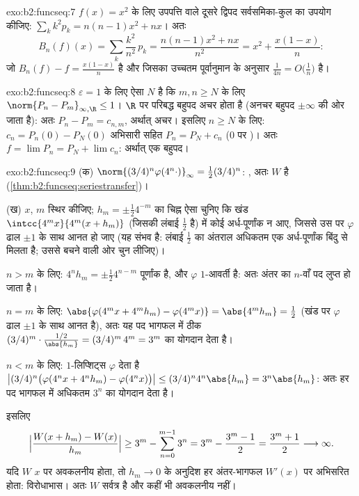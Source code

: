 \begin{solution}{exo:b2:funcseq:7}
$f(x) = x^2$ के लिए उपपत्ति वाले दूसरे द्विपद सर्वसमिका-कुल का उपयोग कीजिए: $\sum_k k^2 p_k = n(n-1)x^2 + nx$।
अतः
\[
B_n(f)(x) = \sum_k \frac{k^2}{n^2}\,p_k
= \frac{n(n-1)x^2 + nx}{n^2}
= x^2 + \frac{x(1 - x)}{n} :
\]
जो $B_n(f) - f = \frac{x(1-x)}{n}$ है और जिसका उच्चतम  पूर्वानुमान के अनुसार $\frac{1}{4n} =
O\bigl(\frac1n\bigr)$ है।
\end{solution}

\begin{solution}{exo:b2:funcseq:8}
$\varepsilon = 1$ के लिए ऐसा $N$ है कि $m, n \geq N$ के लिए $\norm{P_n - P_m}_{\infty,
\R} \leq 1$। $\R$ पर परिबद्ध बहुपद अचर होता है
(अनचर बहुपद $\pm\infty$ की ओर जाता है): अतः $P_n - P_m =
c_{n,m}$, अर्थात् अचर। इसलिए $n \geq N$ के लिए:
$c_n = P_n(0) - P_N(0)$ अभिसारी सहित $P_n = P_N + c_n$ ($0$ पर )। अतः $f = \lim P_n = P_N + \lim c_n$: अर्थात् एक
बहुपद।
\end{solution}

\begin{solution}{exo:b2:funcseq:9}
(क) $\norm{(3/4)^n\varphi(4^n\cdot)}_\infty = \frac12
(3/4)^n$: , अतः $W$  है (\cref{thm:b2:funcseq:seriestransfer})।

(ख) $x$, $m$ स्थिर कीजिए; $h_m = \pm\frac12 4^{-m}$ का चिह्न ऐसा चुनिए कि खंड $\intcc{4^mx}{4^m(x + h_m)}$ (जिसकी लंबाई
$\frac12$ है) में कोई अर्ध-पूर्णांक न आए, जिससे उस पर $\varphi$ ढाल $\pm1$ के साथ आनत हो
जाए (यह संभव है: लंबाई $\frac12$ का अंतराल अधिकतम एक अर्ध-पूर्णांक बिंदु से
मिलता है; उससे बचने वाली ओर चुन लीजिए)।

$n > m$ के लिए: $4^n h_m = \pm\frac12 4^{n-m}$ पूर्णांक है, और $\varphi$ $1$-आवर्ती है: अतः अंतर का $n$-वाँ
पद लुप्त हो जाता है।

$n = m$ के लिए: $\abs{\varphi(4^m x + 4^m h_m) - \varphi(4^m x)} =
\abs{4^m h_m} = \frac12$ (खंड पर $\varphi$ ढाल $\pm 1$ के साथ आनत है), अतः यह पद भागफल में
ठीक $(3/4)^m \cdot
\frac{1/2}{\abs{h_m}} = (3/4)^m\,4^m = 3^m$ का योगदान देता है।

$n < m$ के लिए: $1$-लिप्शिट्स $\varphi$ देता है $\bigl|(3/4)^n\bigl(\varphi(4^nx + 4^nh_m) -
\varphi(4^nx)\bigr)\bigr| \leq (3/4)^n 4^n\abs{h_m} =
3^n\abs{h_m}$: अतः हर पद भागफल में अधिकतम $3^n$
का योगदान देता है।

इसलिए
\[
\Bigl|\frac{W(x + h_m) - W(x)}{h_m}\Bigr|
\geq 3^m - \sum_{n=0}^{m-1} 3^n
= 3^m - \frac{3^m - 1}{2} = \frac{3^m + 1}{2}
\longrightarrow \infty .
\]
यदि $W$ $x$ पर अवकलनीय होता, तो $h_m \to 0$ के अनुदिश हर अंतर-भागफल $W'(x)$ पर
अभिसरित होता: विरोधाभास। अतः $W$ सर्वत्र  है और कहीं भी अवकलनीय नहीं।
\end{solution}

